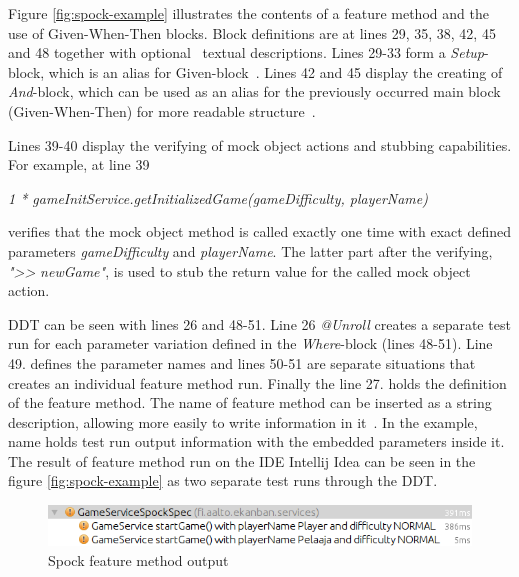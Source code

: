     Figure \ref{fig:spock-example} illustrates the contents of a feature method and the use of Given-When-Then blocks.
    Block definitions are at lines 29, 35, 38, 42, 45 and 48 together
    with optional~\cite{spock} textual descriptions.
    Lines 29-33 form a \textit{Setup}-block, which is an alias for Given-block~\cite{spock}.
    Lines 42 and 45 display the creating of \textit{And}-block, which can be used as
    an alias for the previously occurred main block (Given-When-Then) for more readable structure~\cite{kapelonis2016java}.

    Lines 39-40 display the verifying of mock object actions and stubbing capabilities.
    For example, at line 39
    \begin{center}
    \textit{1 * gameInitService.getInitializedGame(gameDifficulty, playerName)}
    \end{center}
    verifies that the mock object method is called exactly one time with exact defined parameters \textit{gameDifficulty} and \textit{playerName}.
    The latter part after the verifying, \textit{"\textgreater\textgreater} \textit{newGame"}, is used to stub the return value for the
    called mock object action.

    DDT can be seen with lines 26 and 48-51.
    Line 26 \textit{@Unroll} creates a separate test run for each parameter
    variation defined in the \textit{Where}-block (lines 48-51). Line 49. defines the parameter names and lines 50-51 are
    separate situations that creates an individual feature method run. Finally the line 27. holds the definition of
    the feature method. The name of feature method can be inserted as a string description, allowing more easily to write
    information in it~\cite{kapelonis2016java}. In the example, name holds test run output information with the embedded parameters inside it.
    The result of feature method run on the IDE Intellij Idea can be seen in the figure \ref{fig:spock-example} as two separate test runs through the DDT.
    \begin{figure}[ht]
      \begin{center}
        \includegraphics[width=12.5cm]{images/spock-result.png}
        \caption{Spock feature method output}
        \label{fig:spock-result}
      \end{center}
    \end{figure}

